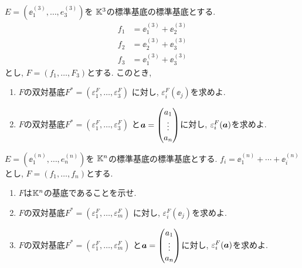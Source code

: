 \begin{quiz}
  $E=(\ee^{(3)}_1,\ldots,e^{(3)}_3)$を
  $\mathbb{K}^3$の標準基底の標準基底とする.
  \begin{align*}
    f_1 &=\ee^{(3)}_1+\ee^{(3)}_2\\
    f_2 &=\ee^{(3)}_2+\ee^{(3)}_3\\
    f_3 &=\ee^{(3)}_1+\ee^{(3)}_3
  \end{align*}
  とし, $F=(f_1,\ldots,F_3)$とする.
  このとき,
   \begin{enumerate}
    \item $F$の双対基底$F^\ast=(\varepsilon_1^{F},\ldots,\varepsilon_3^{F})$
      に対し, $\varepsilon_i^{F}(\ee_j)$を求めよ.
    \item $F$の双対基底$F^\ast=(\varepsilon_1^{F},\ldots,\varepsilon_3^{F})$
      と$\boldsymbol{a}=\begin{pmatrix}a_1\\\vdots\\a_n\end{pmatrix}$に対し,
      $\varepsilon_i^{F}(\boldsymbol{a})$を求めよ.
   \end{enumerate}
\end{quiz}

\begin{quiz}
  $E=(\ee^{(n)}_1,\ldots,e^{(n)}_n)$を
  $\mathbb{K}^n$の標準基底の標準基底とする.
  $f_i=\ee^{(n)}_1+\cdots+\ee^{(n)}_i$とし,
  $F=(f_1,\ldots,f_n)$とする.
  \begin{enumerate}
    \item $F$は$\mathbb{K}^n$の基底であることを示せ.
    \item $F$の双対基底$F^\ast=(\varepsilon_1^{F},\ldots,\varepsilon_m^{F})$
      に対し, $\varepsilon_i^{F}(\ee_j)$を求めよ.
    \item $F$の双対基底$F^\ast=(\varepsilon_1^{F},\ldots,\varepsilon_m^{F})$
      と$\boldsymbol{a}=\begin{pmatrix}a_1\\\vdots\\a_n\end{pmatrix}$に対し,
      $\varepsilon_i^{F}(\boldsymbol{a})$を求めよ.
  \end{enumerate}
\end{quiz}

